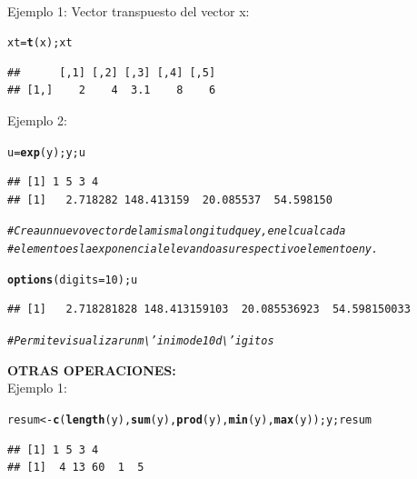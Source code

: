 \documentclass[12pt,letterpaper]{article}\usepackage[]{graphicx}\usepackage[]{color}
\makeatletter
\newcommand{\hlnum}[1]{\textcolor[rgb]{0.686,0.059,0.569}{#1}}%
\newcommand{\hlcom}[1]{\textcolor[rgb]{0.678,0.584,0.686}{\textit{#1}}}%
\newcommand{\hlstd}[1]{\textcolor[rgb]{0.345,0.345,0.345}{#1}}%
\newcommand{\hlkwb}[1]{\textcolor[rgb]{0.69,0.353,0.396}{#1}}%
\newcommand{\hlkwc}[1]{\textcolor[rgb]{0.333,0.667,0.333}{#1}}%
\newcommand{\hlkwd}[1]{\textcolor[rgb]{0.737,0.353,0.396}{\textbf{#1}}}%
\newenvironment{kframe}{%
 \def\at@end@of@kframe{}%
 \ifinner\ifhmode%
  \def\at@end@of@kframe{\end{minipage}}%
  \begin{minipage}{\columnwidth}%
 \fi\fi%
 \def\FrameCommand##1{\hskip\@totalleftmargin \hskip-\fboxsep
 \colorbox{shadecolor}{##1}\hskip-\fboxsep
     \hskip-\linewidth \hskip-\@totalleftmargin \hskip\columnwidth}%
 \MakeFramed {\advance\hsize-\width
   \@totalleftmargin\z@ \linewidth\hsize
   \@setminipage}}%
 {\par\unskip\endMakeFramed%
 \at@end@of@kframe}
\newenvironment{knitrout}{}{} %
\makeatother
\begin{document}
\\ Ejemplo 1: Vector transpuesto del vector x:
\begin{knitrout}
\color{fgcolor}\begin{kframe}
\begin{alltt}
\hlstd{xt} \hlkwb{=} \hlkwd{t}\hlstd{(x); xt}
\end{alltt}
\begin{verbatim}
##      [,1] [,2] [,3] [,4] [,5]
## [1,]    2    4  3.1    8    6
\end{verbatim}
\end{kframe}
\end{knitrout}
Ejemplo 2: 
\begin{knitrout}
\color{fgcolor}\begin{kframe}
\begin{alltt}
\hlstd{u} \hlkwb{=} \hlkwd{exp}\hlstd{(y);y;u}
\end{alltt}
\begin{verbatim}
## [1] 1 5 3 4
## [1]   2.718282 148.413159  20.085537  54.598150
\end{verbatim}
\begin{alltt}
\hlcom{# Crea un nuevo vector de la misma longitud que y, en el cual cada }
\hlcom{#elemento es la exponencial elevando a su respectivo elemento en y.}
\end{alltt}
\end{kframe}
\end{knitrout}
\begin{knitrout}
\color{fgcolor}\begin{kframe}
\begin{alltt}
\hlkwd{options}\hlstd{(}\hlkwc{digits}\hlstd{=}\hlnum{10}\hlstd{); u}
\end{alltt}
\begin{verbatim}
## [1]   2.718281828 148.413159103  20.085536923  54.598150033
\end{verbatim}
\begin{alltt}
\hlcom{# Permite visualizar un m\textbackslash{}'inimo de 10 d\textbackslash{}'igitos}
\end{alltt}
\end{kframe}
\end{knitrout}

\textbf{OTRAS OPERACIONES:}\\

Ejemplo 1:
\begin{knitrout}
\color{fgcolor}\begin{kframe}
\begin{alltt}
\hlstd{resum} \hlkwb{<-} \hlkwd{c}\hlstd{(}\hlkwd{length}\hlstd{(y),} \hlkwd{sum}\hlstd{(y),} \hlkwd{prod}\hlstd{(y),} \hlkwd{min}\hlstd{(y),} \hlkwd{max}\hlstd{(y)); y;resum}
\end{alltt}
\begin{verbatim}
## [1] 1 5 3 4
## [1]  4 13 60  1  5
\end{verbatim}
\end{kframe}
\end{knitrout}
\end{document}
